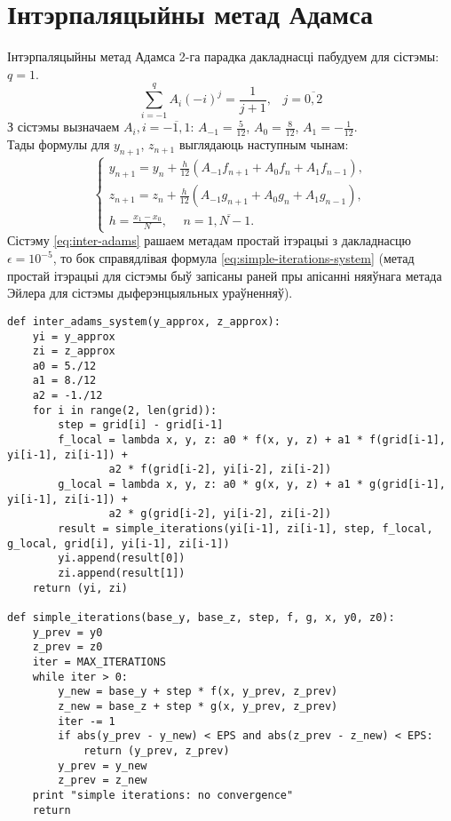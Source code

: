 \section{Інтэрпаляцыйны метад Адамса}
Інтэрпаляцыйны метад Адамса 2-га парадка дакладнасці пабудуем для сістэмы: $q = 1$.
\begin{equation}
    \sum _{i=-1}^{q} A_i(-i)^{j} = \frac{1}{j+1}, \hspace{10pt} j = \overline{0,2}
\end{equation}
З сістэмы вызначаем $A_i, i = \overline{-1, 1}$: $A_{-1} = \frac{5}{12}$, $A_0 = \frac{8}{12}$, $A_1 = -\frac{1}{12}$.\\
Тады формулы для $y_{n+1}$, $z_{n+1}$ выглядаюць наступным чынам:
\begin{equation} \label{eq:inter-adams}
    \begin{cases}
        y_{n+1} = y_n + \frac{h}{12}(A_{-1}f_{n+1} + A_0f_n + A_1f_{n-1}), \\
        z_{n+1} = z_n + \frac{h}{12}(A_{-1}g_{n+1} + A_0g_n + A_1g_{n-1}), \\
        h = \frac{x_1 - x_0}{N},\hspace{15pt} n = \overline{1, N-1}.
    \end{cases}
\end{equation}
Сістэму \eqref{eq:inter-adams} рашаем метадам простай ітэрацыі з дакладнасцю $\epsilon = 10^{-5}$, то бок справядлівая формула \eqref{eq:simple-iterations-system} (метад простай ітэрацыі для сістэмы быў запісаны раней пры апісанні няяўнага метада Эйлера для сістэмы дыферэнцыяльных ураўненняў).

{\small
\begin{verbatim}
def inter_adams_system(y_approx, z_approx):
    yi = y_approx
    zi = z_approx
    a0 = 5./12
    a1 = 8./12
    a2 = -1./12
    for i in range(2, len(grid)):
        step = grid[i] - grid[i-1]
        f_local = lambda x, y, z: a0 * f(x, y, z) + a1 * f(grid[i-1], yi[i-1], zi[i-1]) +
                a2 * f(grid[i-2], yi[i-2], zi[i-2])
        g_local = lambda x, y, z: a0 * g(x, y, z) + a1 * g(grid[i-1], yi[i-1], zi[i-1]) +
                a2 * g(grid[i-2], yi[i-2], zi[i-2])
        result = simple_iterations(yi[i-1], zi[i-1], step, f_local, g_local, grid[i], yi[i-1], zi[i-1])
        yi.append(result[0])
        zi.append(result[1])
    return (yi, zi)

def simple_iterations(base_y, base_z, step, f, g, x, y0, z0):
    y_prev = y0
    z_prev = z0
    iter = MAX_ITERATIONS
    while iter > 0:
        y_new = base_y + step * f(x, y_prev, z_prev)
        z_new = base_z + step * g(x, y_prev, z_prev)
        iter -= 1
        if abs(y_prev - y_new) < EPS and abs(z_prev - z_new) < EPS:
            return (y_prev, z_prev)
        y_prev = y_new
        z_prev = z_new
    print "simple iterations: no convergence"
    return
\end{verbatim}
}

